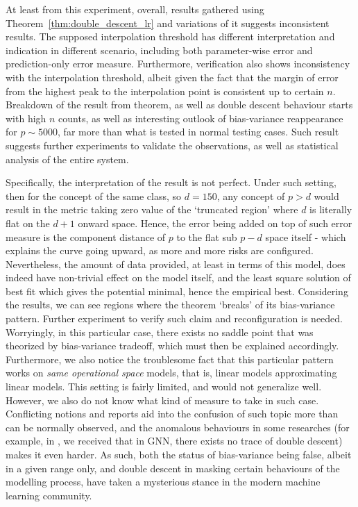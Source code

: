 \documentclass[
  journal=largetwo,
  year=2025,
  volume=37,
]{cup-journal}
\begin{document}
At least from this experiment, overall, results gathered using Theorem~\ref{thm:double_descent_lr} and variations of it suggests inconsistent results. The supposed interpolation threshold has different interpretation and indication in different scenario, including both parameter-wise error and prediction-only error measure. Furthermore, verification also shows inconsistency with the interpolation threshold, albeit given the fact that the margin of error from the highest peak to the interpolation point is consistent up to certain $n$. Breakdown of the result from theorem, as well as double descent behaviour starts with high $n$ counts, as well as interesting outlook of bias-variance reappearance for $p\sim 5000$, far more than what is tested in normal testing cases. Such result suggests further experiments to validate the observations, as well as statistical analysis of the entire system. 

Specifically, the interpretation of the result is not perfect. Under such setting, then for the concept of the same class, so $d=150$, any concept of $p>d$ would result in the metric taking zero value of the `truncated region' where $d$ is literally flat on the $d+1$ onward space. Hence, the error being added on top of such error measure is the component distance of $p$ to the flat sub $p-d$ space itself - which explains the curve going upward, as more and more risks are configured. Nevertheless, the amount of data provided, at least in terms of this model, does indeed have non-trivial effect on the model itself, and the least square solution of best fit which gives the potential minimal, hence the empirical best. Considering the results, we can see regions where the theorem `breaks' of its bias-variance pattern. Further experiment to verify such claim and reconfiguration is needed. Worryingly, in this particular case, there exists no saddle point that was theorized by bias-variance tradeoff, which must then be explained accordingly. Furthermore, we also notice the troublesome fact that this particular pattern works on \textit{same operational space} models, that is, linear models approximating linear models. This setting is fairly limited, and would not generalize well. However, we also do not know what kind of measure to take in such case. Conflicting notions and reports aid into the confusion of such topic more than can be normally observed, and the anomalous behaviours in some researches (for example, in \cite{shi2024homophilymodulatesdoubledescent}, we received that in GNN, there exists no trace of double descent) makes it even harder. As such, both the status of bias-variance being false, albeit in a given range only, and double descent in masking certain behaviours of the modelling process, have taken a mysterious stance in the modern machine learning community.
\end{document}
